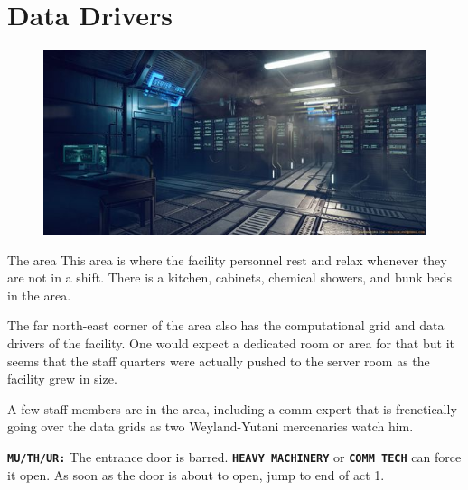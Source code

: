 %


\clearpage

\section{Data Drivers}


\begin{figure}
    \centering
    \includegraphics[width=.45\textwidth]{img/bg/server.jpg}
\end{figure}


\begin{rpg-commentbox}{The area}
    This area is where the facility personnel rest and relax whenever they are not in a shift. There is a kitchen, cabinets, chemical showers, and bunk beds in the area. 
    
    The far north-east corner of the area also has the computational grid and data drivers of the facility. One would expect a dedicated room or area for that but it seems that the staff quarters were actually pushed to the server room as the facility grew in size. 

    A few staff members are in the area, including a comm expert that is frenetically going over the data grids as two Weyland-Yutani mercenaries watch him. 

    \texttt{\textbf{MU/TH/UR:}} The entrance door is barred. \texttt{\textbf{HEAVY MACHINERY}} or \texttt{\textbf{COMM TECH}} can force it open. As soon as the door is about to open, jump to end of act 1.
\end{rpg-commentbox}  


